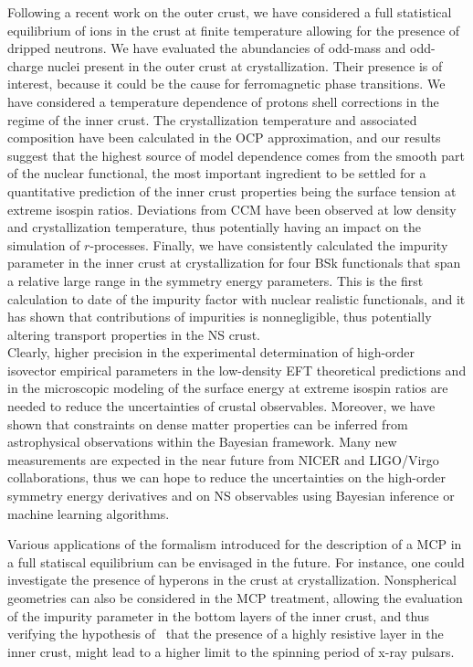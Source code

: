 Following a recent work on the outer crust, we have considered a full
statistical equilibrium of ions in the crust at finite temperature allowing for 
the presence of dripped neutrons. We have evaluated the abundancies of odd-mass 
and odd-charge nuclei present in the outer crust at crystallization. Their
presence is of interest, because it could be the cause for ferromagnetic phase 
transitions. 
We have considered a temperature dependence of protons shell corrections in the 
regime of the inner crust. The crystallization temperature and associated
composition have been calculated in the OCP approximation, and our results
suggest that the highest source of model dependence comes from the smooth part
of the nuclear functional, the most important ingredient to be settled for a
quantitative prediction of the inner crust properties being the surface tension
at extreme isospin ratios. 
Deviations from CCM have been observed at low density and crystallization
temperature, thus potentially having an impact on the simulation of 
$r$-processes.
Finally, we have consistently calculated the impurity parameter in the inner 
crust at crystallization for four BSk functionals that span a relative large 
range in the symmetry energy parameters. This is the first calculation to date
of the impurity factor with nuclear realistic functionals, and it has shown 
that contributions of impurities is nonnegligible, thus potentially altering 
transport properties in the NS crust.
\\

Clearly, higher precision in the experimental determination of high-order
isovector empirical parameters in the low-density EFT theoretical predictions 
and in the microscopic modeling of the surface energy at extreme isospin ratios 
are needed to reduce the uncertainties of crustal observables. Moreover, 
we have shown that constraints on dense matter properties can be inferred from 
astrophysical observations within the Bayesian framework. 
Many new measurements are expected in the near future from NICER and LIGO/Virgo 
collaborations, thus we can hope to reduce the uncertainties on the 
high-order symmetry energy derivatives and on NS observables using Bayesian 
inference or machine learning algorithms.

Various applications of the formalism introduced for the description of a MCP 
in a full statiscal equilibrium can be envisaged in the future. For instance, 
one could investigate the presence of hyperons in the crust at crystallization. 
Nonspherical geometries can also be considered in the MCP treatment, allowing 
the evaluation of the impurity parameter in the bottom layers of the inner 
crust, and thus verifying the hypothesis of~\cite{Pons2013} that the presence
of a highly resistive layer in the inner crust, might lead to a higher limit to
the spinning period of x-ray pulsars.

